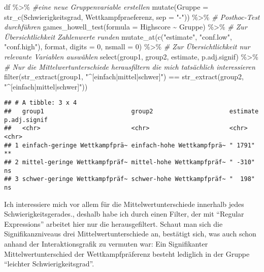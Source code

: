 \documentclass[
]{book}
\newenvironment{Shaded}{\begin{snugshade}}{\end{snugshade}}
\newcommand{\AttributeTok}[1]{\textcolor[rgb]{0.77,0.63,0.00}{#1}}
\newcommand{\CommentTok}[1]{\textcolor[rgb]{0.56,0.35,0.01}{\textit{#1}}}
\newcommand{\DecValTok}[1]{\textcolor[rgb]{0.00,0.00,0.81}{#1}}
\newcommand{\FunctionTok}[1]{\textcolor[rgb]{0.00,0.00,0.00}{#1}}
\newcommand{\NormalTok}[1]{#1}
\newcommand{\SpecialCharTok}[1]{\textcolor[rgb]{0.00,0.00,0.00}{#1}}
\newcommand{\StringTok}[1]{\textcolor[rgb]{0.31,0.60,0.02}{#1}}
\begin{document}
\begin{Shaded}
\begin{Highlighting}[]
\NormalTok{df }\SpecialCharTok{\%\textgreater{}\%} 
  \CommentTok{\#eine neue Gruppenvariable erstellen}
  \FunctionTok{mutate}\NormalTok{(}\AttributeTok{Gruppe =} \FunctionTok{str\_c}\NormalTok{(Schwierigkeitsgrad, Wettkampfpraeferenz, }\AttributeTok{sep =} \StringTok{"{-}"}\NormalTok{)) }\SpecialCharTok{\%\textgreater{}\%} 
  \CommentTok{\# Posthoc{-}Test durchführen}
  \FunctionTok{games\_howell\_test}\NormalTok{(}\AttributeTok{formula =}\NormalTok{ Highscore }\SpecialCharTok{\textasciitilde{}}\NormalTok{ Gruppe) }\SpecialCharTok{\%\textgreater{}\%} 
  \CommentTok{\# Zur Übersichtlichkeit Zahlenwerte runden}
  \FunctionTok{mutate\_at}\NormalTok{(}\FunctionTok{c}\NormalTok{(}\StringTok{"estimate"}\NormalTok{, }\StringTok{"conf.low"}\NormalTok{, }\StringTok{"conf.high"}\NormalTok{), format, }\AttributeTok{digits =} \DecValTok{0}\NormalTok{, }\AttributeTok{nsmall =} \DecValTok{0}\NormalTok{) }\SpecialCharTok{\%\textgreater{}\%} 
  \CommentTok{\# Zur Übersichtlichkeit nur relevante Variablen auswählen}
  \FunctionTok{select}\NormalTok{(group1, group2, estimate, p.adj.signif) }\SpecialCharTok{\%\textgreater{}\%} 
  \CommentTok{\# Nur die Mittelwertunterschiede herausfiltern die mich tatsächlich interessieren }
  \FunctionTok{filter}\NormalTok{(}\FunctionTok{str\_extract}\NormalTok{(group1, }\StringTok{"\^{}[einfach|mittel|schwer]"}\NormalTok{) }\SpecialCharTok{==} \FunctionTok{str\_extract}\NormalTok{(group2, }\StringTok{"\^{}[einfach|mittel|schwer]"}\NormalTok{))}
\end{Highlighting}
\end{Shaded}

\begin{verbatim}
## # A tibble: 3 x 4
##   group1                        group2                     estimate p.adj.signif
##   <chr>                         <chr>                      <chr>    <chr>       
## 1 einfach-geringe Wettkampfprä~ einfach-hohe Wettkampfprä~ " 1791"  **          
## 2 mittel-geringe Wettkampfpräf~ mittel-hohe Wettkampfpräf~ " -310"  ns          
## 3 schwer-geringe Wettkampfpräf~ schwer-hohe Wettkampfpräf~ "  198"  ns
\end{verbatim}

Ich interessiere mich vor allem für die Mittelwertunterschiede innerhalb jedes Schwierigkeitsgerades., deshalb habe ich durch einen Filter, der mit ``Regular Expressions'' arbeitet hier nur die herausgefiltert. Schaut man sich die Signifikanzniveaus drei Mittelwertunterschiede an, bestätigt sich, was auch schon anhand der Interaktionsgrafik zu vermuten war: Ein Signifikanter Mittelwertunterschied der Wettkampfpräferenz besteht lediglich in der Gruppe ``leichter Schwierigkeitsgrad''.
\end{document}
